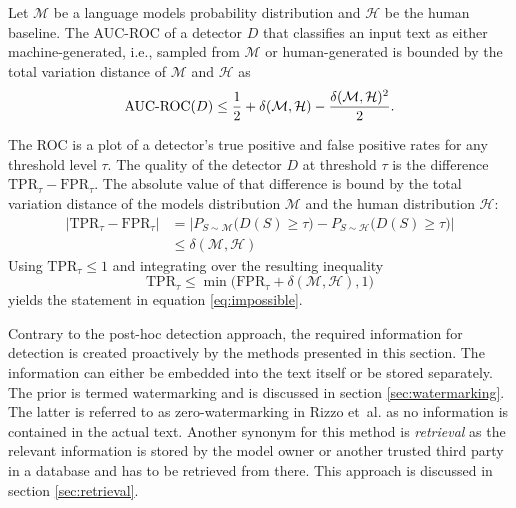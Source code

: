     \begin{theorem}
        Let $\mathcal{M}$ be a language models probability distribution and $\mathcal{H}$ be the human baseline.
        The AUC-ROC of a detector $D$ that classifies an input text as either machine-generated, i.e., sampled from $\mathcal{M}$ or human-generated is bounded by the total variation distance of $\mathcal{M}$ and $\mathcal{H}$ as
        \begin{equation}
        \label{eq:impossible}
            \textnormal{AUC-ROC}(D) \leq \frac{1}{2} + \delta(\mathcal{M}, \mathcal{H}) - \frac{\delta(\mathcal{M}, \mathcal{H})^2}{2} \text{.}
        \end{equation}
    \end{theorem}

    \begin{proof_sketch}
        The ROC is a plot of a detector's true positive and false positive rates for any threshold level $\tau$.
        The quality of the detector $D$ at threshold $\tau$ is the difference $\mathrm{TPR}_{\tau} - \mathrm{FPR}_{\tau}$.
        The absolute value of that difference is bound by the total variation distance of the models distribution $\mathcal{M}$ and the human distribution $\mathcal{H}$:
        \begin{equation}
        \begin{split}
            \left| \mathrm{TPR}_{\tau} - \mathrm{FPR}_{\tau} \right|
                & = \left| P_{S \sim \mathcal{M}}\big( D(S) \geq \tau \big) - P_{S \sim \mathcal{H}}\big( D(S) \geq \tau \big)\right| \\
                & \leq \delta(\mathcal{M}, \mathcal{H})
        \end{split}
        \end{equation}
        Using $\mathrm{TPR}_{\tau} \leq 1$ and integrating over the resulting inequality
        \begin{equation}
            \mathrm{TPR}_{\tau} \leq \min \big(\mathrm{FPR}_{\tau} + \delta(\mathcal{M}, \mathcal{H}), 1 \big)
        \end{equation}
        yields the statement in equation \ref{eq:impossible}.
    \end{proof_sketch}
    
    Contrary to the post-hoc detection approach, the required information for detection is created proactively by the methods presented in this section.
    The information can either be embedded into the text itself or be stored separately.
    The prior is termed watermarking and is discussed in section \ref{sec:watermarking}.
    The latter is referred to as zero-watermarking in Rizzo et~al. \cite{rizzo2019finegrain} as no information is contained in the actual text.
    Another synonym for this method is \emph{retrieval} as the relevant information is stored by the model owner or another trusted third party in a database and has to be retrieved from there.
    This approach is discussed in section \ref{sec:retrieval}.

